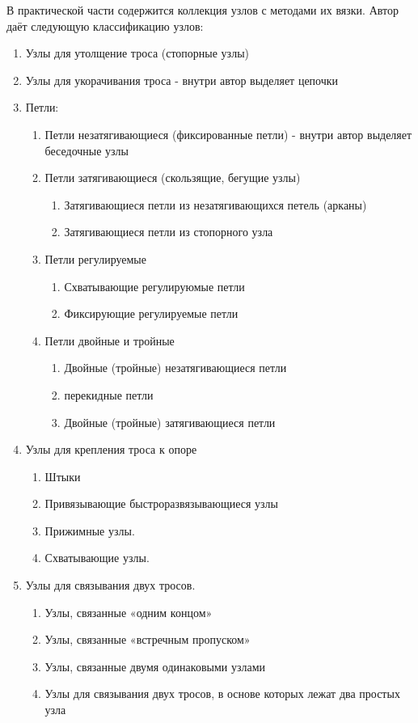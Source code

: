 В практической части содержится коллекция узлов с методами их вязки.
Автор даёт следующую классификацию узлов:
\begin{enumerate}
  \item Узлы для утолщение троса (стопорные узлы)
  \item Узлы для укорачивания троса - внутри автор выделяет цепочки
  \item Петли:
  \begin{enumerate}
    \item Петли незатягивающиеся (фиксированные петли) - внутри автор выделяет беседочные узлы
    \item Петли затягивающиеся (скользящие, бегущие узлы)
    \begin{enumerate}
      \item Затягивающиеся петли из незатягивающихся петель (арканы)
      \item Затягивающиеся петли из стопорного узла
    \end{enumerate}
    \item Петли регулируемые
    \begin{enumerate}
      \item Схватывающие регулируюмые петли
      \item Фиксирующие регулируемые петли
    \end{enumerate}
    \item Петли двойные и тройные
    \begin{enumerate}
      \item Двойные (тройные) незатягивающиеся петли
      \item перекидные петли
      \item Двойные (тройные) затягивающиеся петли
    \end{enumerate}
  \end{enumerate}
  \item Узлы для крепления троса к опоре
  \begin{enumerate}
    \item Штыки
    \item Привязывающие быстроразвязывающиеся узлы
    \item Прижимные узлы.
    \item Схватывающие узлы.
  \end{enumerate}
  \item Узлы для связывания двух тросов.
  \begin{enumerate}
    \item Узлы, связанные «одним концом»
    \item Узлы, связанные «встречным пропуском»
    \item Узлы, связанные двумя одинаковыми узлами
    \item Узлы для связывания двух тросов, в основе которых лежат два простых узла
  \end{enumerate}
\end{enumerate}